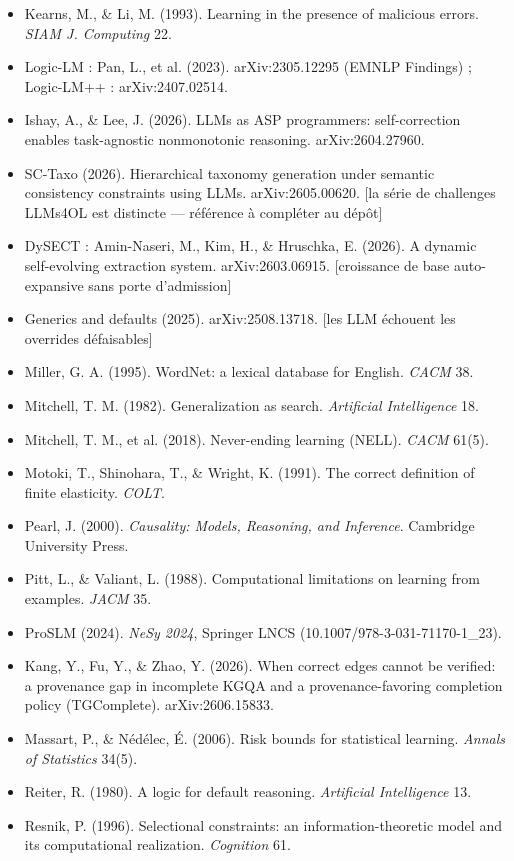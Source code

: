 \documentclass[11pt]{article}
\begin{document}
\begin{itemize}
\item Kearns, M., \& Li, M. (1993). Learning in the presence of malicious errors. \emph{SIAM J. Computing} 22.
\item Logic-LM : Pan, L., et al. (2023). arXiv:2305.12295 (EMNLP Findings) ; Logic-LM++ : arXiv:2407.02514.
\item Ishay, A., \& Lee, J. (2026). LLMs as ASP programmers: self-correction enables task-agnostic nonmonotonic reasoning. arXiv:2604.27960.
\item SC-Taxo (2026). Hierarchical taxonomy generation under semantic consistency constraints using LLMs. arXiv:2605.00620. [la série de challenges LLMs4OL est distincte — référence à compléter au dépôt]
\item DySECT : Amin-Naseri, M., Kim, H., \& Hruschka, E. (2026). A dynamic self-evolving extraction system. arXiv:2603.06915. [croissance de base auto-expansive sans porte d'admission]
\item Generics and defaults (2025). arXiv:2508.13718. [les LLM échouent les overrides défaisables]
\item Miller, G. A. (1995). WordNet: a lexical database for English. \emph{CACM} 38.
\item Mitchell, T. M. (1982). Generalization as search. \emph{Artificial Intelligence} 18.
\item Mitchell, T. M., et al. (2018). Never-ending learning (NELL). \emph{CACM} 61(5).
\item Motoki, T., Shinohara, T., \& Wright, K. (1991). The correct definition of finite elasticity. \emph{COLT}.
\item Pearl, J. (2000). \emph{Causality: Models, Reasoning, and Inference}. Cambridge University Press.
\item Pitt, L., \& Valiant, L. (1988). Computational limitations on learning from examples. \emph{JACM} 35.
\item ProSLM (2024). \emph{NeSy 2024}, Springer LNCS (10.1007/978-3-031-71170-1\_23).
\item Kang, Y., Fu, Y., \& Zhao, Y. (2026). When correct edges cannot be verified: a provenance gap in incomplete KGQA and a provenance-favoring completion policy (TGComplete). arXiv:2606.15833.
\item Massart, P., \& Nédélec, É. (2006). Risk bounds for statistical learning. \emph{Annals of Statistics} 34(5).
\item Reiter, R. (1980). A logic for default reasoning. \emph{Artificial Intelligence} 13.
\item Resnik, P. (1996). Selectional constraints: an information-theoretic model and its computational realization. \emph{Cognition} 61.

\end{itemize}
\end{document}

